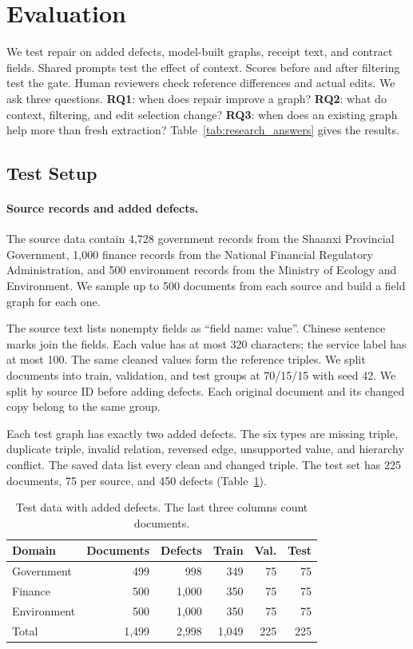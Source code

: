\section{Evaluation}
\label{sec:eval}
\label{sec:experiments}

We test repair on added defects, model-built graphs, receipt text, and
contract fields. Shared prompts test the effect of context. Scores before
and after filtering test the gate. Human reviewers check reference
differences and actual edits.
We ask three questions. \textbf{RQ1}: when does repair improve a graph?
\textbf{RQ2}: what do context, filtering, and edit selection change?
\textbf{RQ3}: when does an existing graph help more than fresh extraction?
Table~\ref{tab:research_answers} gives the results.

\subsection{Test Setup}
\label{sec:eval:setup}

\paragraph{Source records and added defects.}
The source data contain 4,728 government records from the Shaanxi Provincial
Government, 1,000 finance records from the National Financial Regulatory
Administration, and 500 environment records from the Ministry of Ecology
and Environment. We sample up to 500 documents from each source and build a
field graph for each one.

The source text lists nonempty fields as ``field name: value''.
Chinese sentence marks join the fields. Each value has at most 320 characters;
the service label has at most 100. The same cleaned values form the reference
triples. We split documents into train, validation, and test groups at
70/15/15 with seed 42. We split by source ID before adding defects.
Each original document and its changed copy belong to the same group.

Each test graph has exactly two added defects. The six types are missing
triple, duplicate triple, invalid relation, reversed edge, unsupported value,
and hierarchy conflict. The saved data list every clean and changed triple.
The test set has 225 documents, 75 per source, and 450 defects
(Table~\ref{tab:repair_benchmark}).

\begin{table}[t]
\centering
\caption{Test data with added defects. The last three columns count documents.}
\label{tab:repair_benchmark}
\small
\begin{tabular}{l r r r r r}
\toprule
Domain & Documents & Defects & Train & Val. & Test \\
\midrule
Government & 499 & 998 & 349 & 75 & 75 \\
Finance & 500 & 1,000 & 350 & 75 & 75 \\
Environment & 500 & 1,000 & 350 & 75 & 75 \\
\midrule
Total & 1,499 & 2,998 & 1,049 & 225 & 225 \\
\bottomrule
\end{tabular}
\end{table}

